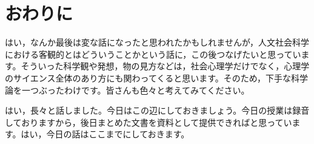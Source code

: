 \documentclass{ltjsbook}
\begin{document}
\section{おわりに}
はい，なんか最後は変な話になったと思われたかもしれませんが，人文社会科学における客観的とはどういうことかという話に，この後つなげたいと思っています。そういった科学観や発想，物の見方などは，社会心理学だけでなく，心理学のサイエンス全体のあり方にも関わってくると思います。そのため，下手な科学論を一つぶったわけです。皆さんも色々と考えてみてください。

はい，長々と話しました。今日はこの辺にしておきましょう。今日の授業は録音しておりますから，後日まとめた文書を資料として提供できればと思っています。はい，今日の話はここまでにしておきます。
\printbibliography[title=引用文献]
\end{document}
